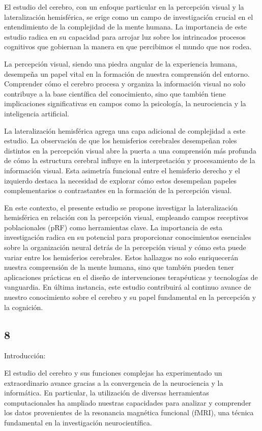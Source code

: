 \documentclass{article}
\begin{document}
	El estudio del cerebro, con un enfoque particular en la percepción visual y la lateralización hemisférica, se erige como un campo de investigación crucial en el entendimiento de la complejidad de la mente humana. La importancia de este estudio radica en su capacidad para arrojar luz sobre los intrincados procesos cognitivos que gobiernan la manera en que percibimos el mundo que nos rodea.
	
	La percepción visual, siendo una piedra angular de la experiencia humana, desempeña un papel vital en la formación de nuestra comprensión del entorno. Comprender cómo el cerebro procesa y organiza la información visual no solo contribuye a la base científica del conocimiento, sino que también tiene implicaciones significativas en campos como la psicología, la neurociencia y la inteligencia artificial.
	
	La lateralización hemisférica agrega una capa adicional de complejidad a este estudio. La observación de que los hemisferios cerebrales desempeñan roles distintos en la percepción visual abre la puerta a una comprensión más profunda de cómo la estructura cerebral influye en la interpretación y procesamiento de la información visual. Esta asimetría funcional entre el hemisferio derecho y el izquierdo destaca la necesidad de explorar cómo estos desempeñan papeles complementarios o contrastantes en la formación de la percepción visual.
	
	En este contexto, el presente estudio se propone investigar la lateralización hemisférica en relación con la percepción visual, empleando campos receptivos poblacionales (pRF) como herramientas clave. La importancia de esta investigación radica en su potencial para proporcionar conocimientos esenciales sobre la organización neural detrás de la percepción visual y cómo esta puede variar entre los hemisferios cerebrales. Estos hallazgos no solo enriquecerán nuestra comprensión de la mente humana, sino que también pueden tener aplicaciones prácticas en el diseño de intervenciones terapéuticas y tecnologías de vanguardia. En última instancia, este estudio contribuirá al continuo avance de nuestro conocimiento sobre el cerebro y su papel fundamental en la percepción y la cognición.
	
	\subsection{8}
	
	Introducción:
	
	El estudio del cerebro y sus funciones complejas ha experimentado un extraordinario avance gracias a la convergencia de la neurociencia y la informática. En particular, la utilización de diversas herramientas computacionales ha ampliado nuestras capacidades para analizar y comprender los datos provenientes de la resonancia magnética funcional (fMRI), una técnica fundamental en la investigación neurocientífica.
	
\end{document}
